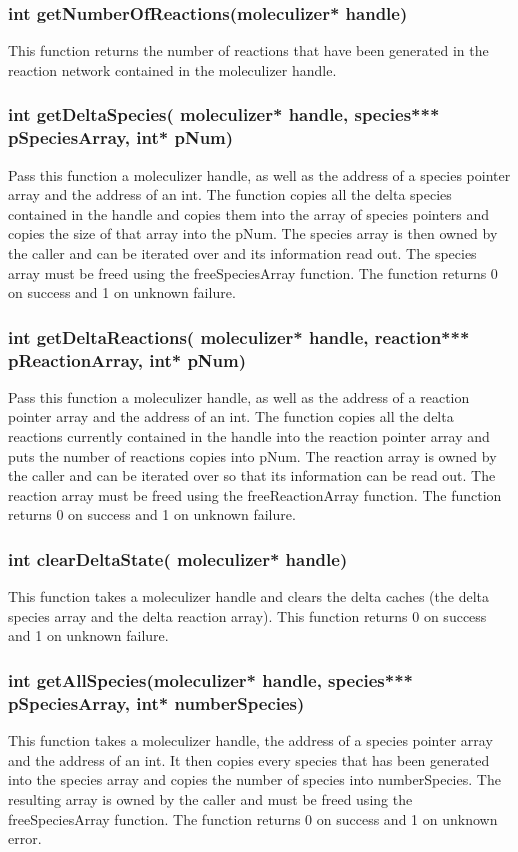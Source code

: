 \subsubsection{int getNumberOfReactions(moleculizer* handle)}
This function returns the number of reactions that have been generated
in the reaction network contained in the moleculizer handle. 

\subsubsection{int getDeltaSpecies( moleculizer* handle, species***
  pSpeciesArray, int* pNum)}
Pass this function a moleculizer handle, as well as the address of a
species pointer array and the address of an int.  The function copies
all the delta species contained in the handle and copies them into the
array of species pointers and copies the size of that array into the
pNum.  The species array is then owned by the caller and can be
iterated over and its information read out.  The species array must be
freed using the freeSpeciesArray function.  The function returns 0 on
success and 1 on unknown failure.

\subsubsection{int getDeltaReactions( moleculizer* handle, reaction***
  pReactionArray, int* pNum)}
Pass this function a moleculizer handle, as well as the address of a
reaction pointer array and the address of an int.  The function copies
all the delta reactions currently contained in the handle into the
reaction pointer array and puts the number of reactions copies into
pNum.  The reaction array is owned by the caller and can be iterated
over so that its information can be read out.  The reaction array must
be freed using the freeReactionArray function.  The function returns 0
on success and 1 on unknown failure.

\subsubsection{int clearDeltaState( moleculizer* handle)}
This function takes a moleculizer handle and clears the delta caches
(the delta species array and the delta reaction array).  This function
returns 0 on success and 1 on unknown failure. 

\subsubsection{int getAllSpecies(moleculizer* handle, species***
  pSpeciesArray, int* numberSpecies)}
This function takes a moleculizer handle, the address of a species
pointer array and the address of an int.  It then copies every species
that has been generated into the species array and copies the number
of species into numberSpecies.  The resulting array is owned by the
caller and must be freed using the freeSpeciesArray function.  The
function returns 0 on success and 1 on unknown error.

